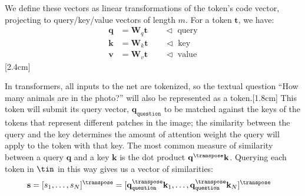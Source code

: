 We define these vectors as linear transformations of the token's code vector, projecting to query/key/value vectors of length $m$. For a token $\mathbf{t}$, we have:
\begin{align}
    \mathbf{q} & = \mathbf{W}_q \mathbf{t} \quad\quad \triangleleft \text{ query} \\
    \mathbf{k} & = \mathbf{W}_k \mathbf{t} \quad\quad \triangleleft \text{ key}   \\
    \mathbf{v} & = \mathbf{W}_v \mathbf{t} \quad\quad \triangleleft \text{ value}
\end{align}
[2.4cm]






In transformers, all inputs to the net are tokenized, so the textual question ``How many animals are in the photo?'' will also be represented as a token.[1.8cm] This token will submit its query vector, $\mathbf{q}_{\texttt{question}}$ to be matched against the keys of the tokens that represent different patches in the image; the similarity between the query and the key determines the amount of attention weight the query will apply to the token with that key. The most common measure of similarity between a query $\mathbf{q}$ and a key $\mathbf{k}$ is the dot product $\mathbf{q}^\transpose\mathbf{k}$. Querying each token in $\tin$ in this way gives us a vector of similarities: %
\begin{align}
    \mathbf{s} = [s_1, \ldots, s_N]^\transpose & = [\mathbf{q}_{\texttt{question}}^\transpose\mathbf{k}_1, \ldots, \mathbf{q}_{\texttt{question}}^\transpose\mathbf{k}_N]^\transpose \label{eqn:transformers:attention_question_keys}
\end{align}

